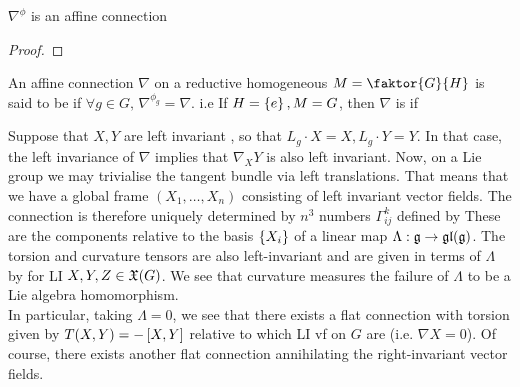 \documentclass{article}
\begin{document}
\begin{lemma}
	$\nabla^\phi$ is an affine connection
\end{lemma}
\begin{proof}
\end{proof}

\begin{definition}
	An affine connection $\nabla$ on a reductive homogeneous $M=\faktor{G}{H}$ is said to be  if $\forall g \in G, \, \nabla^{\phi_g} = \nabla$. i.e 
	If $H = \pbrace{e}, M=G$, then $\nabla$ is  if 
\end{definition}

Suppose that $X,Y$ are left invariant , so that $L_g \cdot X = X, L_g \cdot Y = Y$. In that case, the left invariance of $\nabla$ implies that $\nabla_XY$ is also left invariant. Now, on a Lie group we may trivialise the tangent bundle via left translations. That means that we have a global frame $(X_1, \dots, X_n)$ consisting of left invariant vector fields. The connection is therefore uniquely determined by $n^3$ numbers $\Gamma^k_{ij}$ defined by 
These are the components relative to the basis $\pbrace{X_i}$ of a linear map $\Lambda : \mf{g} \to \mf{gl}(\mf{g})$. The torsion and curvature tensors are also left-invariant and are given in terms of $\Lambda$ by 
for LI $X,Y,Z \in \mf{X}(G)$. We see that curvature measures the failure of $\Lambda$ to be a Lie algebra homomorphism. \\
In particular, taking $\Lambda = 0$, we see that there exists a flat connection with torsion given by $T(X,Y) = -\comm[X]{Y}$ relative to which LI vf on $G$ are  (i.e. $\nabla X = 0$). Of course, there exists another flat connection annihilating the right-invariant vector fields. 
\end{document}
